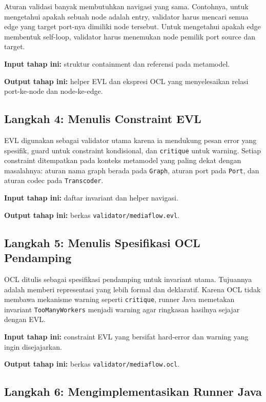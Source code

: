 Aturan validasi banyak membutuhkan navigasi yang sama. Contohnya, untuk mengetahui apakah sebuah node adalah entry, validator harus mencari semua edge yang target port-nya dimiliki node tersebut. Untuk mengetahui apakah edge membentuk self-loop, validator harus menemukan node pemilik port source dan target.

\textbf{Input tahap ini:} struktur containment dan referensi pada metamodel.

\textbf{Output tahap ini:} helper EVL dan ekspresi OCL yang menyelesaikan relasi port-ke-node dan node-ke-edge.

\subsection{Langkah 4: Menulis Constraint EVL}

EVL digunakan sebagai validator utama karena ia mendukung pesan error yang spesifik, guard untuk constraint kondisional, dan \texttt{critique} untuk warning. Setiap constraint ditempatkan pada konteks metamodel yang paling dekat dengan masalahnya: aturan nama graph berada pada \texttt{Graph}, aturan port pada \texttt{Port}, dan aturan codec pada \texttt{Transcoder}.

\textbf{Input tahap ini:} daftar invariant dan helper navigasi.

\textbf{Output tahap ini:} berkas \texttt{validator/mediaflow.evl}.

\subsection{Langkah 5: Menulis Spesifikasi OCL Pendamping}

OCL ditulis sebagai spesifikasi pendamping untuk invariant utama. Tujuannya adalah memberi representasi yang lebih formal dan deklaratif. Karena OCL tidak membawa mekanisme warning seperti \texttt{critique}, runner Java memetakan invariant \texttt{TooManyWorkers} menjadi warning agar ringkasan hasilnya sejajar dengan EVL.

\textbf{Input tahap ini:} constraint EVL yang bersifat hard-error dan warning yang ingin disejajarkan.

\textbf{Output tahap ini:} berkas \texttt{validator/mediaflow.ocl}.

\subsection{Langkah 6: Mengimplementasikan Runner Java}

